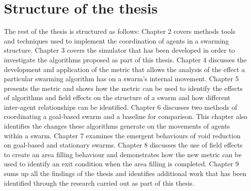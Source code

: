\section{Structure of the thesis}
The rest of the thesis is structured as follows: Chapter 2 covers methods tools and techniques used to implement the coordination of agents in a swarming structure. Chapter 3 covers the simulator that has been developed in order to investigate the algorithms proposed as part of this thesis. Chapter 4 discusses the development and application of the metric that allows the analysis of the effect a particular swarming algorithm has on a swarm's internal movement. Chapter 5 presents the metric and shows how the metric can be used to identify the effects of algorithms and field effects on the structure of a swarm and how different inter-agent relationships can be identified. Chapter 6 discusses two methods of coordinating a goal-based swarm and a baseline for comparison. This chapter also identifies the changes these algorithms generate on the movements of agents within a swarm. Chapter 7 examines the emergent behaviours of void reduction on goal-based and stationary swarms. Chapter 8 discusses the use of field effects to create an area filling behaviour and demonstrates how the new metric can be used to identify an exit condition when the area filling is completed. Chapter 9 sums up all the findings of the thesis and identifies additional work that has been identified through the research carried out as part of this thesis.
